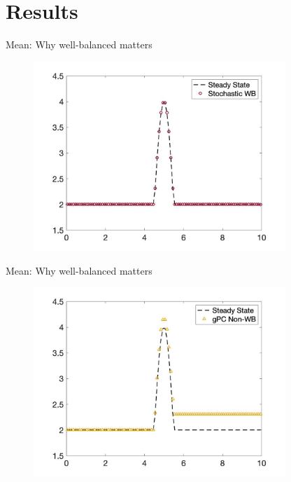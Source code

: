 \documentclass[
    pdf,
    11pt,
    xcolor={svgnames},
  ]{beamer}
\begin{document}
\section{Results}
\begin{frame}{Mean: Why well-balanced matters}
    \begin{figure}
    \centering
    \includegraphics[width=0.85\textwidth]{./Figures/burgers_wb_mean}
    \end{figure}
\end{frame}
\begin{frame}{Mean: Why well-balanced matters}
    \begin{figure}
    \centering
    \includegraphics[width=0.85\textwidth]{./Figures/burgers_non_mean}
    \end{figure}
\end{frame}
\end{document}
